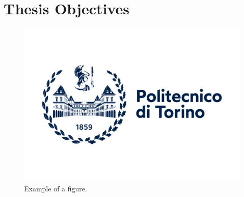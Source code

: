 \section{Thesis Objectives}

\cite{Alpher01}  

\begin{figure}
    \includegraphics[width=1.0\linewidth]{./images/logo/logoPoliTo_with_name_2021.jpg}
    \caption{Example of a figure.}
    \label{fig:overall_1}
  \end{figure}